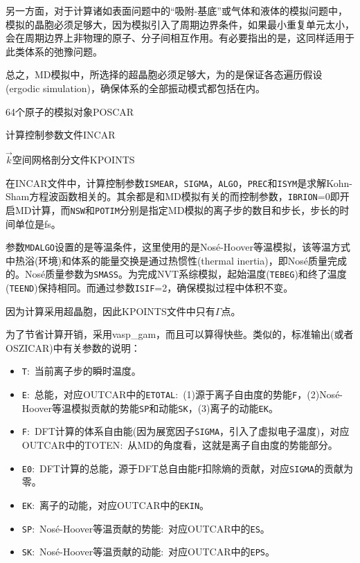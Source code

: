 另一方面，对于计算诸如表面问题中的``吸附-基底''或气体和液体的模拟问题中，模拟的晶胞必须足够大，因为模拟引入了周期边界条件，如果最小重复单元太小，会在周期边界上非物理的原子、分子间相互作用。有必要指出的是，这同样适用于此类体系的弛豫问题。

总之，\textrm{MD}模拟中，所选择的超晶胞必须足够大，为的是保证各态遍历假设\textrm{(ergodic simulation)}，确保体系的全部振动模式都包括在内。

64个原子的模拟对象\textrm{POSCAR}

计算控制参数文件\textrm{INCAR}

$\vec k$空间网格剖分文件\textrm{KPOINTS}

在\textrm{INCAR}文件中，计算控制参数\texttt{ISMEAR}，\texttt{SIGMA}，\texttt{ALGO}，\texttt{PREC}和\texttt{ISYM}是求解\textrm{Kohn-Sham}方程波函数相关的。其余都是和\textrm{MD}模拟有关的而控制参数，\texttt{IBRION}=0即开启\textrm{MD}计算，而\texttt{NSW}和\texttt{POTIM}分别是指定\textrm{MD}模拟的离子步的数目和步长，步长的时间单位是\textrm{fs}。

参数\texttt{MDALGO}设置的是等温条件，这里使用的是\textrm{Nos\'e-Hoover}等温模拟，该等温方式中热浴(环境)和体系的能量交换是通过热惯性\textrm{(thermal inertia)}，即\textrm{Nos\'e}质量完成的。\textrm{Nos\'e}质量参数为\texttt{SMASS}。为完成\textrm{NVT}系综模拟，起始温度(\texttt{TEBEG})和终了温度(\texttt{TEEND})保持相同。而通过参数\texttt{ISIF}=2，确保模拟过程中体积不变。

因为计算采用超晶胞，因此\textrm{KPOINTS}文件中只有$\Gamma$点。

为了节省计算开销，采用\textrm{vasp\_gam}，而且可以算得快些。类似的，标准输出(或者\textrm{OSZICAR})中有关参数的说明：

\begin{itemize}
	\item \texttt{T}:~当前离子步的瞬时温度。
	\item \texttt{E}:~总能，对应\textrm{OUTCAR}中的\texttt{ETOTAL}:~(1)源于离子自由度的势能\texttt{F}，(2)\textrm{Nos\'e-Hoover}等温模拟贡献的势能\texttt{SP}和动能\texttt{SK}，(3)离子的动能\texttt{EK}。
	\item \texttt{F}:~\textrm{DFT}计算的体系自由能(因为展宽因子\texttt{SIGMA}，引入了虚拟电子温度)，对应\textrm{OUTCAR}中的\textrm{TOTEN}:~从\textrm{MD}的角度看，这就是离子自由度的势能部分。
	\item \texttt{E0}:~\textrm{DFT}计算的总能，源于\textrm{DFT}总自由能\texttt{F}扣除熵的贡献，对应\texttt{SIGMA}的贡献为零。
	\item \texttt{EK}:~离子的动能，对应\textrm{OUTCAR}中的\texttt{EKIN}。
	\item \texttt{SP}:~\textrm{Nos\'e-Hoover}等温贡献的势能:~对应\textrm{OUTCAR}中的\texttt{ES}。
	\item \texttt{SK}:~\textrm{Nos\'e-Hoover}等温贡献的动能:~对应\textrm{OUTCAR}中的\texttt{EPS}。
\end{itemize}

